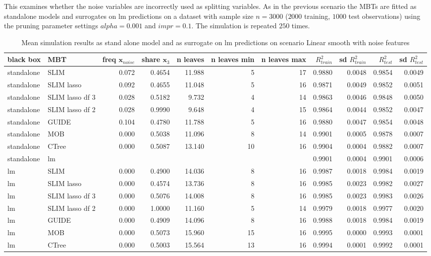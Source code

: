 This examines whether the noise variables are incorrectly used as splitting variables.
As in the previous scenario the MBTs are fitted as standalone models and surrogates on lm predictions on a dataset with sample size $ n = 3000$ ($2000$ training, $1000$ test observations) using the pruning parameter settings $alpha = 0.001$ and $impr = 0.1$. The simulation is repeated $250$ times.

\begin{table}[!htb]
\centering \tiny
\begin{tabular}[t]{l|l|r|r|r|r|r|r|r|r|r}
\hline
black box & MBT & freq $ \textbf{x}_{noise}$  & share $\textbf{x}_3$ & n leaves & n leaves min & n leaves max & $R^2_{train}$  & sd $R^2_{train}$ & $R^2_{test}$ & sd $R^2_{test}$\\
\hline
standalone & SLIM & 0.072 & 0.4654 & 11.988 & 5 & 17 & 0.9880 & 0.0048 & 0.9854 & 0.0049\\
standalone & SLIM lasso & 0.092 & 0.4655 & 11.048 & 5 & 16 & 0.9871 & 0.0049 & 0.9852 & 0.0051\\
standalone & SLIM lasso df 3 & 0.028 & 0.5182 & 9.732 & 4 & 14 & 0.9863 & 0.0046 & 0.9848 & 0.0050\\
standalone & SLIM lasso df 2 & 0.028 & 0.9990 & 9.648 & 4 & 15 & 0.9864 & 0.0044 & 0.9852 & 0.0047\\
standalone & GUIDE & 0.104 & 0.4780 & 11.788 & 5 & 16 & 0.9880 & 0.0047 & 0.9854 & 0.0048\\
standalone & MOB & 0.000 & 0.5038 & 11.096 & 8 & 14 & 0.9901 & 0.0005 & 0.9878 & 0.0007\\
standalone & CTree & 0.000 & 0.5087 & 13.140 & 10 & 16 & 0.9904 & 0.0004 & 0.9882 & 0.0007\\
\hline

standalone & lm & & & & & & 0.9901 & 0.0004 & 0.9901 & 0.0006\\

\hline
lm & SLIM & 0.000 & 0.4900 & 14.036 & 8 & 16 & 0.9987 & 0.0018 & 0.9984 & 0.0019\\
lm & SLIM lasso & 0.000 & 0.4574 & 13.736 & 8 & 16 & 0.9985 & 0.0023 & 0.9982 & 0.0027\\
lm & SLIM lasso df 3 & 0.000 & 0.5076 & 14.008 & 8 & 16 & 0.9985 & 0.0023 & 0.9983 & 0.0026\\
lm & SLIM lasso df 2 & 0.000 & 1.0000 & 11.160 & 5 & 14 & 0.9979 & 0.0018 & 0.9977 & 0.0020\\
lm & GUIDE & 0.000 & 0.4909 & 14.096 & 8 & 16 & 0.9988 & 0.0018 & 0.9984 & 0.0019\\
lm & MOB & 0.000 & 0.5073 & 15.960 & 15 & 16 & 0.9995 & 0.0000 & 0.9993 & 0.0001\\
lm & CTree & 0.000 & 0.5003 & 15.564 & 13 & 16 & 0.9994 & 0.0001 & 0.9992 & 0.0001\\
\hline
\end{tabular}
\label{tab:linear_smooth_noisy_summary}
\caption{Mean simulation results as stand alone model and as surrogate on lm predictions on scenario Linear smooth with noise features}
\end{table}

